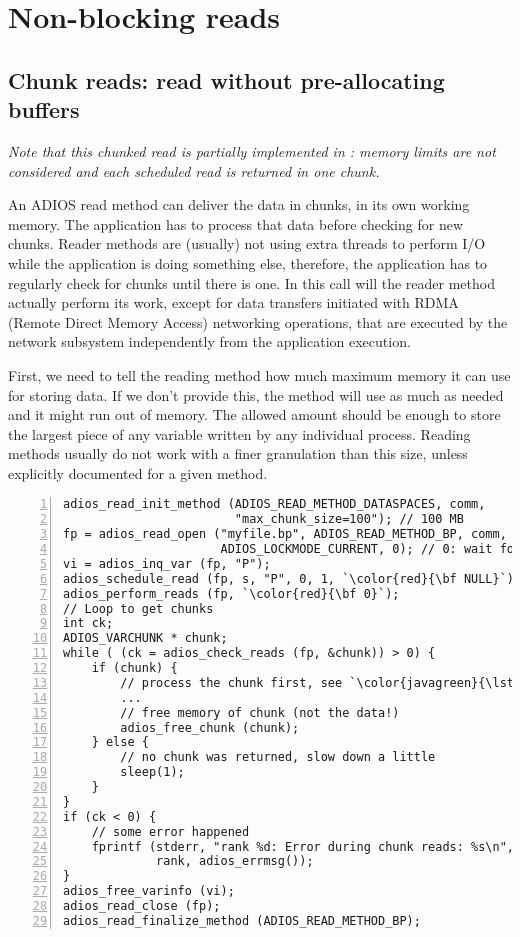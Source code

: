 
\section{Non-blocking reads}

\subsection{Chunk reads: read without pre-allocating buffers}
\emph{Note that this chunked read is partially implemented in \adiosversion: memory limits are not considered and each scheduled read is returned in one chunk.}

An ADIOS read method can deliver the data in chunks, in its own working memory. 
The application has to process that data before checking for new chunks. 
Reader methods are (usually) not using extra threads to perform I/O while 
the application is doing something else, therefore, the application has to 
regularly check for chunks until there is one. In this call will the reader 
method actually perform its work, except for data transfers initiated with 
RDMA (Remote Direct Memory Access) networking operations, that are executed 
by the network subsystem independently from the application execution. 

First, we need to tell the reading method how much maximum memory it can use for storing data. If we don't provide this, the method will use as much as needed and it might run out of memory. The allowed amount should be enough to store the largest piece of any variable written by any individual process. Reading methods usually do not work with a finer granulation than this size, unless explicitly documented for a given method. 

\begin{lstlisting}[numbers=left, numberstyle=\color{gray}, stepnumber=2,
                             caption={Read variable with auto selection in chunks from a stream}, label=code:auto_read_chunks]
adios_read_init_method (ADIOS_READ_METHOD_DATASPACES, comm, 
                        "max_chunk_size=100"); // 100 MB 
fp = adios_read_open ("myfile.bp", ADIOS_READ_METHOD_BP, comm,
                      ADIOS_LOCKMODE_CURRENT, 0); // 0: wait forever
vi = adios_inq_var (fp, "P");
adios_schedule_read (fp, s, "P", 0, 1, `\color{red}{\bf NULL}`);
adios_perform_reads (fp, `\color{red}{\bf 0}`);   
// Loop to get chunks
int ck;
ADIOS_VARCHUNK * chunk;
while ( (ck = adios_check_reads (fp, &chunk)) > 0) {
    if (chunk) {
        // process the chunk first, see `\color{javagreen}{\lstlistingname~\ref{code:process_chunk}}`
        ... 
        // free memory of chunk (not the data!)
        adios_free_chunk (chunk);
    } else {
        // no chunk was returned, slow down a little
        sleep(1);
    }
}  
if (ck < 0) {
    // some error happened
    fprintf (stderr, "rank %d: Error during chunk reads: %s\n",
             rank, adios_errmsg());
}
adios_free_varinfo (vi); 
adios_read_close (fp);
adios_read_finalize_method (ADIOS_READ_METHOD_BP);
\end{lstlisting}

